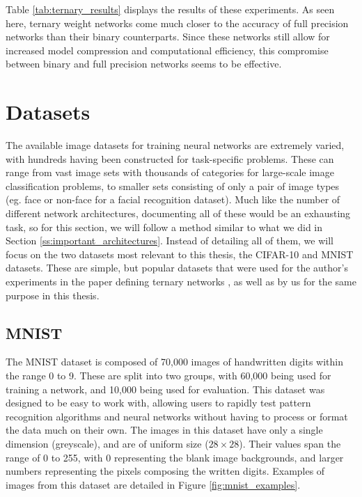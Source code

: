 \documentclass[11pt,a4paper,oldfontcommands]{memoir}
\begin{document}
Table \ref{tab:ternary_results} displays the results of these experiments. As seen here, ternary weight networks come much closer to the accuracy of full precision networks than their binary counterparts. Since these networks still allow for increased model compression and computational efficiency, this compromise between binary and full precision networks seems to be effective.

\section{Datasets}
The available image datasets for training neural networks are extremely varied, with hundreds having been constructed for task-specific problems. These can range from vast image sets with thousands of categories for large-scale image classification problems, to smaller sets consisting of only a pair of image types (eg. face or non-face for a facial recognition dataset). Much like the number of different network architectures, documenting all of these would be an exhausting task, so for this section, we will follow a method similar to what we did in Section \ref{ss:important_architectures}. Instead of detailing all of them, we will focus on the two datasets most relevant to this thesis, the CIFAR-10 and MNIST datasets. These are simple, but popular datasets that were used for the author's experiments in the paper defining ternary networks \cite{ternary}, as well as by us for the same purpose in this thesis. 

\subsection{MNIST}
The MNIST dataset \cite{mnist} is composed of 70,000 images of handwritten digits within the range 0 to 9. These are split into two groups, with 60,000 being used for training a network, and 10,000 being used for evaluation. This dataset was designed to be easy to work with, allowing users to rapidly test pattern recognition algorithms and neural networks without having to process or format the data much on their own. The images in this dataset have only a single dimension (greyscale), and are of uniform size ($28 \times 28$). Their values span the range of 0 to 255, with 0 representing the blank image backgrounds, and larger numbers representing the pixels composing the written digits. Examples of images from this dataset are detailed in Figure \ref{fig:mnist_examples}.
\end{document}
